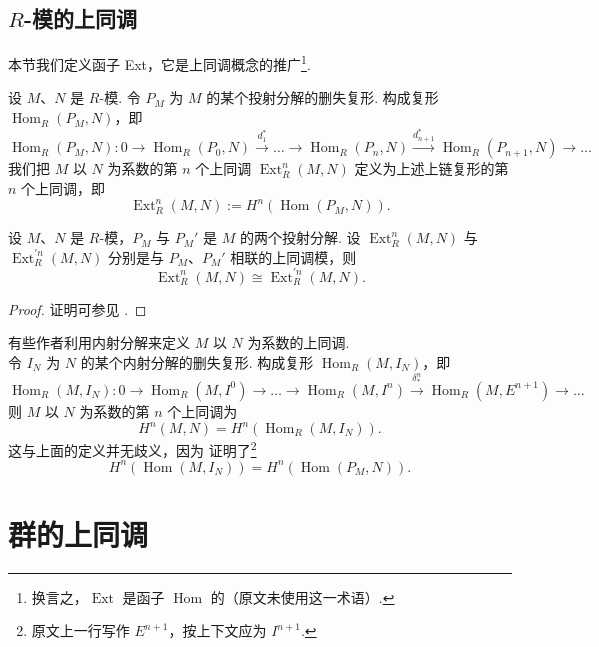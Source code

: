 \subsection{\texorpdfstring{$R$}{R}-模的上同调}

本节我们定义函子 Ext，它是上同调概念的推广\footnote{换言之，$\operatorname{Ext}$ 是函子 $\operatorname{Hom}$ 的（原文未使用这一术语）.}.

\begin{definition}\label{c4-def-3-6}
设 $M$、$N$ 是 $R$-模. 令 $P_M$ 为 $M$ 的某个投射分解的删失复形. 构成复形 $\operatorname{Hom}_R(P_M, N)$，即
\[
\operatorname{Hom}_R(P_M, N):0\to\operatorname{Hom}_R(P_0, N)\xrightarrow{d^*_1}\ldots\to\operatorname{Hom}_R(P_n, N)\xrightarrow{d^*_{n+1}}\operatorname{Hom}_R(P_{n+1}, N)\to\ldots
\]
我们把 $M$ 以 $N$ 为系数的第 $n$ 个上同调 $\operatorname{Ext}^n_R(M, N)$ 定义为上述上链复形的第 $n$ 个上同调，即
\[
\operatorname{Ext}^n_R(M, N):=H^n(\operatorname{Hom}(P_M, N)).
\]
\end{definition}

\begin{theorem}\label{c4-thm-3-4}
设 $M$、$N$ 是 $R$-模，$P_M$ 与 $P_M'$ 是 $M$ 的两个投射分解. 设 $\operatorname{Ext}^n_R(M, N)$ 与 $\operatorname{Ext}^{'n}_R(M, N)$ 分别是与 $P_M$、$P_M'$ 相联的上同调模，则
\[
\operatorname{Ext}^n_R(M, N)\cong\operatorname{Ext}^{'n}_R(M, N).
\]
\end{theorem}

\begin{proof}
证明可参见 \cite[Proposition~6.40, \S6.2]{rot09}.
\end{proof}

\begin{remark}\label{c4-rem-3-7}
有些作者利用内射分解来定义 $M$ 以 $N$ 为系数的上同调.\\
令 $I_N$ 为 $N$ 的某个内射分解的删失复形. 构成复形 $\operatorname{Hom}_R(M, I_N)$，即
\[
\operatorname{Hom}_R(M, I_N):0\to\operatorname{Hom}_R(M, I^0)\to\ldots\to\operatorname{Hom}_R(M, I^n)\xrightarrow{\delta^n_*}\operatorname{Hom}_R(M, E^{n+1})\to\ldots
\]
则 $M$ 以 $N$ 为系数的第 $n$ 个上同调为
\[
H^n(M, N)=H^n(\operatorname{Hom}_R(M, I_N)).
\]
这与上面的定义并无歧义，因为 \cite[Theorem~6.67, \S6.2]{rot09} 证明了\footnote{原文上一行写作 $E^{n+1}$，按上下文应为 $I^{n+1}$.}
\[
H^n(\operatorname{Hom}(M, I_N))=H^n(\operatorname{Hom}(P_M, N)).
\]
\end{remark}

\section{群的上同调}

